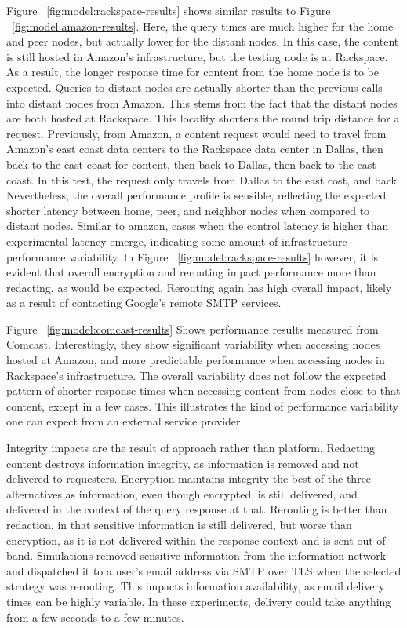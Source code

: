 Figure ~\ref{fig:model:rackspace-results} shows similar results to Figure ~\ref{fig:model:amazon-results}.  Here, the query times are much higher for the home and peer nodes, but actually lower for the distant nodes.  In this case, the content is still hosted in Amazon's infrastructure, but the testing node is at Rackspace.  As a result, the longer response time for content from the home node is to be expected.  Queries to distant nodes are actually shorter than the previous calls into distant nodes from Amazon.  This stems from the fact that the distant nodes are both hosted at Rackspace.  This locality shortens the round trip distance for a request.  Previously, from Amazon, a content request would need to travel from Amazon's east coast data centers to the Rackspace data center in Dallas, then back to the east coast for content, then back to Dallas, then back to the east coast.  In this test, the request only travels from Dallas to the east cost, and back.  Nevertheless, the overall performance profile is sensible, reflecting the expected shorter latency between home, peer, and neighbor nodes when compared to distant nodes.  Similar to amazon, cases when the control latency is higher than experimental latency emerge, indicating some amount of infrastructure performance variability.  In Figure ~\ref{fig:model:rackspace-results} however, it is evident that overall encryption and rerouting impact performance more than redacting, as would be expected.  Rerouting again has high overall impact, likely as a result of contacting Google's remote SMTP services.

Figure ~\ref{fig:model:comcast-results} Shows performance results measured from Comcast.  Interestingly, they show significant variability when accessing nodes hosted at Amazon, and more predictable performance when accessing nodes in Rackspace's infrastructure.  The overall variability does not follow the expected pattern of shorter response times when accessing content from nodes close to that content, except in a few cases.  This illustrates the kind of performance variability one can expect from an external service provider.

Integrity impacts are the result of approach rather than platform.  Redacting content destroys information integrity, as information is removed and not delivered to requesters.  Encryption maintains integrity the best of the three alternatives as information, even though encrypted, is still delivered, and delivered in the context of the query response at that.  Rerouting is better than redaction, in that sensitive information is still delivered, but worse than encryption, as it is not delivered within the response context and is sent out-of-band. Simulations removed sensitive information from the information network and dispatched it to a user's email address via SMTP over TLS when the selected strategy was rerouting.  This impacts information availability, as email delivery times can be highly variable.  In these experiments, delivery could take anything from a few seconds to a few minutes.

